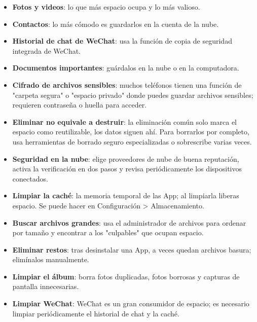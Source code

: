 
\begin{itemize}
  \item \textbf{Fotos y videos}: lo que más espacio ocupa y lo más valioso.
  \item \textbf{Contactos}: lo más cómodo es guardarlos en la cuenta de la nube.
  \item \textbf{Historial de chat de WeChat}: usa la función de copia de seguridad integrada de WeChat.
  \item \textbf{Documentos importantes}: guárdalos en la nube o en la computadora.
\end{itemize}


\begin{itemize}
  \item \textbf{Cifrado de archivos sensibles}: muchos teléfonos tienen una función de "carpeta segura" o "espacio privado" donde puedes guardar archivos sensibles; requieren contraseña o huella para acceder.
  \item \textbf{Eliminar no equivale a destruir}: la eliminación común solo marca el espacio como reutilizable, los datos siguen ahí. Para borrarlos por completo, usa herramientas de borrado seguro especializadas o sobrescribe varias veces.
  \item \textbf{Seguridad en la nube}: elige proveedores de nube de buena reputación, activa la verificación en dos pasos y revisa periódicamente los dispositivos conectados.
\end{itemize}


\begin{itemize}
  \item \textbf{Limpiar la caché}: la memoria temporal de las App; al limpiarla liberas espacio. Se puede hacer en Configuración > Almacenamiento.
  \item \textbf{Buscar archivos grandes}: usa el administrador de archivos para ordenar por tamaño y encontrar a los "culpables" que ocupan espacio.
  \item \textbf{Eliminar restos}: tras desinstalar una App, a veces quedan archivos basura; elimínalos manualmente.
  \item \textbf{Limpiar el álbum}: borra fotos duplicadas, fotos borrosas y capturas de pantalla innecesarias.
  \item \textbf{Limpiar WeChat}: WeChat es un gran consumidor de espacio; es necesario limpiar periódicamente el historial de chat y la caché.
\end{itemize}


